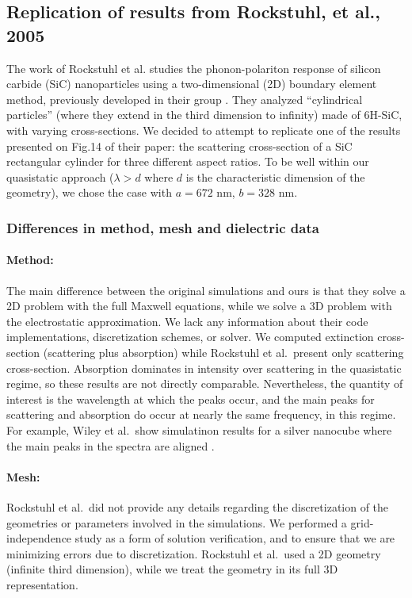 \subsection{Replication of results from Rockstuhl, et al., 2005}\label{sec:replication1}

The work of Rockstuhl et al.\cite{rockstuhl2005} studies the phonon-polariton response of silicon carbide (SiC)
nanoparticles using a two-dimensional (2D) boundary element method, 
previously developed in their group \cite{rockstuhl2003}. 
They analyzed ``cylindrical particles'' (where they extend in the third dimension to infinity) made of 6H-SiC, with varying cross-sections.
We decided to attempt to replicate one of the results presented on Fig.14 of their paper:
the scattering cross-section of a SiC rectangular cylinder for three different aspect ratios. 
To be well within our quasistatic approach ($\lambda > d$ where $d$ is the characteristic
dimension of the geometry), we chose the case with $a=672$ nm, $b=328$ nm.

\subsubsection{Differences in method, mesh and dielectric data}

\paragraph{Method:} The main difference between the original simulations and ours is that they solve a 2D problem with the 
full Maxwell equations, while we solve a 3D problem with the electrostatic approximation. 
We lack any information about their code implementations, discretization schemes, or solver.  
We computed extinction cross-section (scattering plus absorption) while Rockstuhl et al.\ present only scattering cross-section. 
Absorption dominates in intensity over scattering in the quasistatic regime, so these results are not directly comparable. 
Nevertheless, the quantity of interest is the wavelength at which the peaks occur, and the main peaks for scattering and absorption do occur at nearly the same frequency, in this regime. 
For example, Wiley et al.\ show simulatinon results for a silver nanocube where the main peaks in the spectra are aligned \cite{wiley-etal-2006}.

\paragraph{Mesh:} Rockstuhl et al.\ did not provide any details regarding the discretization of the geometries or 
parameters involved in the simulations.
We performed a grid-independence study as a form of solution verification, and to ensure that we are 
minimizing errors due to discretization. Rockstuhl et al.\ used a 2D geometry (infinite third dimension), while we treat the geometry in its full 3D representation.

